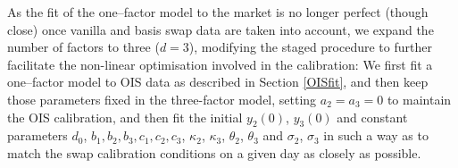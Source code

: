 \documentclass[12pt,a4paper]{article}
\theoremstyle{plain}
\numberwithin{equation}{section}
\begin{document}
%

As the fit of the one--factor model to the market is no longer perfect (though close) once vanilla and basis swap data are taken into account, we expand the number of factors to three ($d=3$), modifying the staged procedure to further facilitate the non-linear optimisation involved in the calibration: We first fit a one--factor model to OIS data as described in Section \ref{OISfit}, and then keep those parameters fixed in the three-factor model, setting $a_2=a_3=0$ to maintain the OIS calibration, and then fit the initial $y_2(0)$, $y_3(0)$ and constant parameters $d_0$, $b_1,b_2,b_3,c_1,c_2,c_3$, $\kappa_2$, $\kappa_3$, $\theta_2$, $\theta_3$ and $\sigma_2$, $\sigma_3$ in such a way as to match the swap calibration conditions on a given day as closely as possible.
\end{document}
